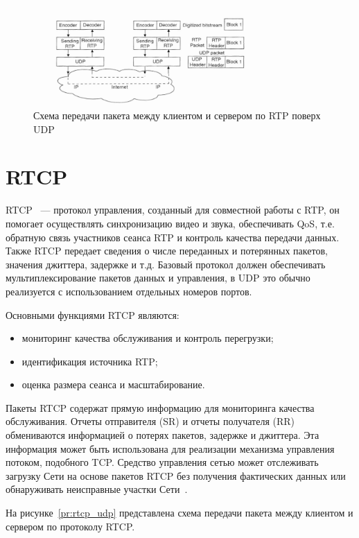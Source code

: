 \begin{figure}[h]
	\centering
	\includegraphics[width=0.8\textwidth]{img/rtp_over_udp.png}
	\caption{Схема  передачи пакета между клиентом и сервером по RTP поверх UDP~\cite{rtp_rtcp_rtsp_mc}}
	\label{pr:rtp_udp}
\end{figure}

\section{RTCP}

RTCP~\cite{rtp_rtcp_overview} --- протокол управления, созданный для совместной работы с RTP, он помогает осуществлять синхронизацию видео и звука, обеспечивать QoS, т.е. обратную связь участников сеанса RTP и контроль качества передачи данных. Также RTCP передает сведения о числе переданных и потерянных пакетов, значения джиттера, задержке и т.д.
Базовый протокол должен обеспечивать мультиплексирование пакетов данных и управления, в UDP это обычно реализуется с использованием отдельных номеров портов.

\clearpage

Основными функциями RTCP являются:
\begin{itemize}
	\item мониторинг качества обслуживания и контроль перегрузки;
	\item идентификация источника RTP;
	\item оценка размера сеанса и масштабирование.
\end{itemize}
Пакеты RTCP содержат прямую информацию для мониторинга качества обслуживания. 
Отчеты отправителя (SR) и отчеты получателя (RR) обмениваются информацией о потерях пакетов, задержке и джиттера. 
Эта информация может быть использована для реализации механизма управления потоком, подобного TCP.
Средство управления сетью может отслеживать загрузку Сети на основе пакетов RTCP без получения фактических данных или обнаруживать неисправные участки Сети~\cite{rtp_rtcp_overview, rtp_rtcp_rtsp_mc}.
 
На рисунке~\ref{pr:rtcp_udp} представлена схема передачи пакета между клиентом и сервером по протоколу RTCP.

